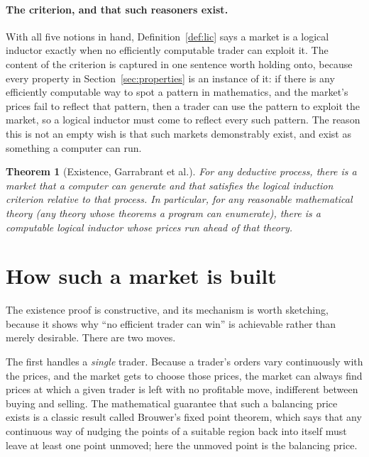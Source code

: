 \documentclass[10pt]{article}
\newtheorem{theorem}{Theorem}[section]
\theoremstyle{definition}
\theoremstyle{remark}
\begin{document}
\paragraph{The criterion, and that such reasoners exist.} With all five notions in hand, Definition~\ref{def:lic} says a market is a logical inductor exactly when no efficiently computable trader can exploit it. The content of the criterion is captured in one sentence worth holding onto, because every property in Section~\ref{sec:properties} is an instance of it: if there is any efficiently computable way to spot a pattern in mathematics, and the market's prices fail to reflect that pattern, then a trader can use the pattern to exploit the market, so a logical inductor must come to reflect every such pattern. The reason this is not an empty wish is that such markets demonstrably exist, and exist as something a computer can run.

\begin{theorem}[Existence, Garrabrant et al.]
\label{thm:existence}
For any deductive process, there is a market that a computer can generate and that satisfies the logical induction criterion relative to that process. In particular, for any reasonable mathematical theory (any theory whose theorems a program can enumerate), there is a computable logical inductor whose prices run ahead of that theory.
\end{theorem}

\section{How such a market is built}
\label{sec:construction}

The existence proof is constructive, and its mechanism is worth sketching, because it shows why ``no efficient trader can win'' is achievable rather than merely desirable. There are two moves.

The first handles a \emph{single} trader. Because a trader's orders vary continuously with the prices, and the market gets to choose those prices, the market can always find prices at which a given trader is left with no profitable move, indifferent between buying and selling. The mathematical guarantee that such a balancing price exists is a classic result called Brouwer's fixed point theorem, which says that any continuous way of nudging the points of a suitable region back into itself must leave at least one point unmoved; here the unmoved point is the balancing price.
\end{document}
